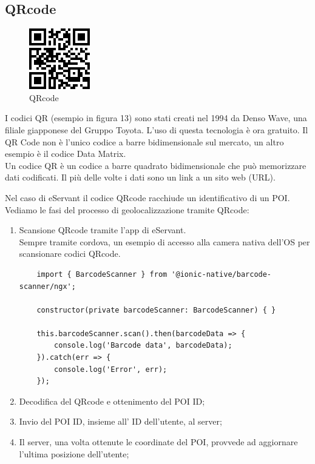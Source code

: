 \subsection{QRcode}
\begin{figure}[H]
    \centering  
    \caption{QRcode}
    \includegraphics[scale=1]{img/cap2/barcode-qrcode}
\end{figure}
I codici QR (esempio in figura 13) sono stati creati nel 1994 da Denso Wave, una filiale giapponese del Gruppo Toyota.
L'uso di questa tecnologia è ora gratuito. Il QR Code non è l'unico codice a barre bidimensionale 
sul mercato, un altro esempio è il codice Data Matrix.
\\
Un codice QR è un codice a barre quadrato bidimensionale che può memorizzare dati codificati. 
Il più delle volte i dati sono un link a un sito web (URL).

Nel caso di eServant il codice QRcode racchiude un identificativo di un POI. \\
Vediamo le fasi del processo di geolocalizzazione tramite QRcode:

\begin{enumerate}
    \item Scansione QRcode tramite l'app di eServant.\\
    Sempre tramite cordova, un esempio di accesso alla camera nativa dell'OS per scansionare
    codici QRcode.
\begin{lstlisting}
    import { BarcodeScanner } from '@ionic-native/barcode-scanner/ngx';
    
    constructor(private barcodeScanner: BarcodeScanner) { }
    
    this.barcodeScanner.scan().then(barcodeData => {
        console.log('Barcode data', barcodeData);
    }).catch(err => {
        console.log('Error', err);
    });
\end{lstlisting}

    \item Decodifica del QRcode e ottenimento del POI ID;
    \item Invio del POI ID, insieme all' ID dell'utente, al server;
    \item Il server, una volta ottenute le coordinate del POI, provvede ad aggiornare l'ultima posizione dell'utente;
\end{enumerate}


